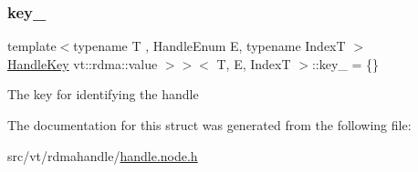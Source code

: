 \subsubsection{\texorpdfstring{key\+\_\+}{key\_}}
{\footnotesize\ttfamily template$<$typename T , Handle\+Enum E, typename IndexT $>$ \\
\hyperlink{structvt_1_1rdma_1_1_handle_key}{Handle\+Key} vt\+::rdma\+::value $>$$>$$<$ T, E, IndexT $>$\+::key\+\_\+ = \{\}\hspace{0.3cm}{\ttfamily [protected]}}

The key for identifying the handle 

The documentation for this struct was generated from the following file\+:\begin{DoxyCompactItemize}
\item 
src/vt/rdmahandle/\hyperlink{handle_8node_8h}{handle.\+node.\+h}\end{DoxyCompactItemize}
